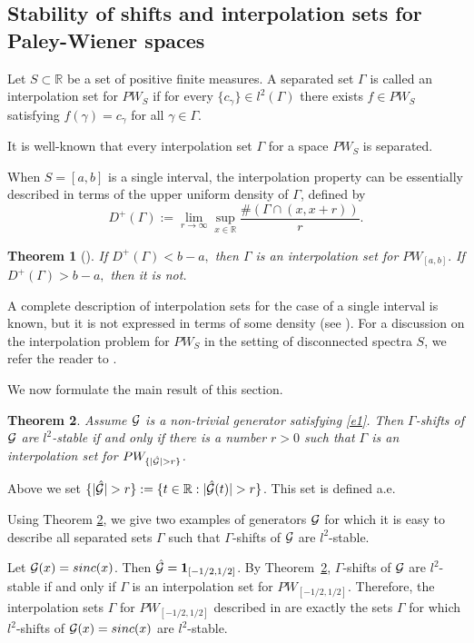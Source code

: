 \documentclass[12pt]{amsart}
\numberwithin{equation}{section}
\newtheorem{theorem}{Theorem}[section]
\newcommand{\R}{{\mathbb R}} \newcommand{\Q}{{\mathbb Q}} \newcommand{\Z}{{\mathbb Z}} \newcommand{\N}{{\mathbb N}}
\newcommand{\sinc}{{\rm sinc}}
\begin{document}
\subsection{Stability of shifts and interpolation sets for Paley-Wiener spaces}  
\begin{definition}  Let  $S\subset\R$ be a set of positive finite measures. A separated set $\Gamma$ is called an interpolation set for $PW_S$ if for every $\{c_\gamma\}\in l^2(\Gamma)$ there exists $f\in PW_S$ satisfying $f(\gamma)=c_\gamma$ for all $\gamma\in\Gamma.$
\end{definition}

It is well-known that every interpolation set $\Gamma$ for a space  $PW_S$ is separated.

When $S=[a,b]$ is a single interval, the interpolation property can be essentially described in terms of the upper uniform density of $\Gamma$, defined by $$D^+(\Gamma):=\lim_{r\to\infty}\sup_{x\in\R}\frac{\#(\Gamma\cap(x,x+r))}{r}.$$ 


\begin{theorem}[\cite{MR102702}]\label{inter}
 If $D^+(\Gamma)<b-a,$ then $\Gamma$ is an interpolation set for $PW_{[a,b]}.$ If $D^+(\Gamma)>
b-a,$ then it is not. 
\end{theorem}


A complete description of interpolation sets for the case of a single interval is known, but it is not expressed in terms of some density (see \cite{MR2040080}). For a discussion on the interpolation problem for $PW_S$ in the setting of disconnected spectra $S$, we refer the reader to \cite[Lecture~5]{ou}. 


We now formulate the main result of this section.
\begin{theorem}\label{t3}
    Assume $\mathcal{G}$ is a non-trivial generator satisfying \eqref{e1}.
   Then $\Gamma$-shifts of $\mathcal{G}$ are $l^2$-stable if and only if there is a number $r>0$ such that $\Gamma$ is an interpolation set for $PW_{\{|\hat\Ff|>r\}}$.   
    \end{theorem}
Above we set $\{|\hat\Ff|>r\}:=\{t\in\R:|\hat\Ff(t)|>r\}$. This set is defined a.e.


Using Theorem \ref{t3}, we give two examples of generators $\mathcal{G}$ for which it is easy to describe all separated sets $\Gamma$ such that  $\Gamma$-shifts of $\mathcal{G}$ are  $l^2$-stable.

\begin{example} Let $\Ff(x)=\sinc(x)$. Then $\hat{\mathcal{G}}={\bf 1}_{[-1/2,1/2]}$. By  Theorem~\ref{t3},   $\Gamma$-shifts of $\mathcal{G}$ are $l^2$-stable if and only if $\Gamma$ is an interpolation set for $PW_{[-1/2,1/2]}$. Therefore, the interpolation sets $\Gamma$ for $PW_{[-1/2,1/2]}$ described in \cite{MR2040080} are exactly the sets $\Gamma$ for which $l^2$-shifts of $\Ff(x)=\sinc(x)$ are $l^2$-stable.\end{example}
\end{document}
